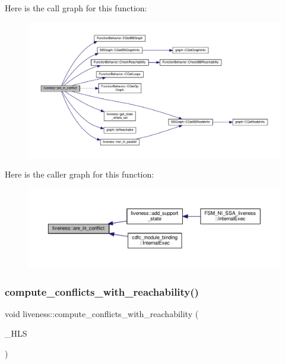 Here is the call graph for this function\+:
\nopagebreak
\begin{figure}[H]
\begin{center}
\leavevmode
\includegraphics[width=350pt]{d3/d1f/classliveness_a7ada63832c3f09f5e9ab213ebb6ebacf_cgraph}
\end{center}
\end{figure}
Here is the caller graph for this function\+:
\nopagebreak
\begin{figure}[H]
\begin{center}
\leavevmode
\includegraphics[width=350pt]{d3/d1f/classliveness_a7ada63832c3f09f5e9ab213ebb6ebacf_icgraph}
\end{center}
\end{figure}
\mbox{\label{classliveness_abb7fa56c7956948411c80808825906a9}} 
\subsubsection{\texorpdfstring{compute\+\_\+conflicts\+\_\+with\+\_\+reachability()}{compute\_conflicts\_with\_reachability()}}
{\footnotesize\ttfamily void liveness\+::compute\+\_\+conflicts\+\_\+with\+\_\+reachability (\begin{DoxyParamCaption}\item[{\hyperlink{hls_8hpp_a75d0c73923d0ddfa28c4843a802c73a7}{hls\+Ref}}]{\+\_\+\+H\+LS }\end{DoxyParamCaption})\hspace{0.3cm}{\ttfamily [inline]}}



